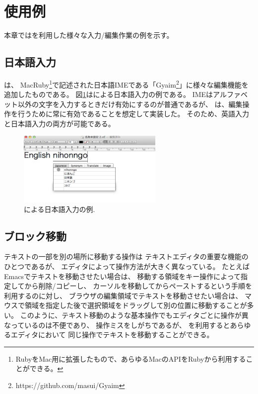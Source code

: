 \section{{\system}使用例}

本章では{\system}を利用した様々な入力/編集作業の例を示す。

\subsection{日本語入力}

{\system}は、
MacRuby\footnote{
  RubyをMac用に拡張したもので、あらゆるMacのAPIをRubyから利用することができる。
}で記述された日本語IMEである「Gyaim\footnote{
 \textsf{https://github.com/masui/Gyaim}
}」に様々な編集機能を追加したものである。
%
図\ref{japaneseinput}は{\system}による日本語入力の例である。
IMEはアルファベット以外の文字を入力するときだけ有効にするのが普通であるが、
{\system}は、編集操作を行うために常に有効であることを想定して実装した。
そのため、英語入力と日本語入力の両方が可能である。

\begin{figure}[H]
\centerline{\includegraphics[width=70mm,bb=0 0 600 320]{figures/japanese.png}}
\caption{{\system}による日本語入力の例.}
\label{japaneseinput}
\end{figure}

\subsection{ブロック移動}

テキストの一部を別の場所に移動する操作は
テキストエディタの重要な機能のひとつであるが、
エディタによって操作方法が大きく異なっている。
たとえばEmacsでテキストを移動させたい場合は、
移動する領域をキー操作によって指定してから削除/コピーし、
カーソルを移動してからペーストするという手順を利用するのに対し、
ブラウザの編集領域でテキストを移動させたい場合は、
マウスで領域を指定した後で選択領域をドラッグして別の位置に移動することが多い。
このように、テキスト移動のような基本操作でもエディタごとに操作が異なっているのは不便であり、
操作ミスをしがちであるが、
{\system}を利用するとあらゆるエディタにおいて
同じ操作でテキストを移動することができる。

